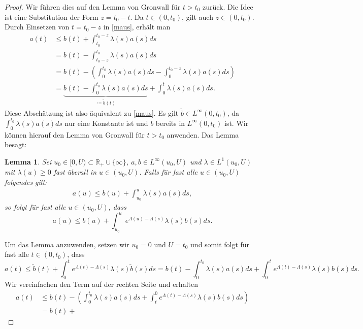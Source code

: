 \documentclass[a4paper]{article}
\theoremstyle{plain}
\newtheorem{lemma}{Lemma}
\begin{document}
	\begin{proof}
		Wir führen dies auf den Lemma von Gronwall für $t > t_0$ zurück. Die Idee ist eine Substitution der Form $z = t_0 - t$. Da $t \in (0,t_0)$, gilt auch $z \in (0,t_0)$. Durch Einsetzen von $t = t_0 - z$ in \eqref{maus},  erhält man
		\begin{align*}
			a(t) &\leq b(t) + \int^{t_0 -z}_{t_0} \lambda (s) a(s)ds\\ &= b(t) - \int^{t_0}_{t_0-z} \lambda (s) a(s)ds \\ &= b(t) - (\int^{t_0}_{0} \lambda (s) a(s)ds -  \int^{t_0-z}_{0} \lambda (s) a(s)ds) \\
			&= \underbrace{b(t) - \int^{t_0}_{0} \lambda (s) a(s)ds}_{ \coloneqq \tilde b(t)} +  \int^{t}_{0} \lambda (s) a(s)ds.
		\end{align*}
		Diese Abschätzung ist also äquivalent zu \eqref{maus}. Es gilt $\tilde b \in L^{\infty}(0,t_0)$, da $ \int^{t_0}_{0} \lambda (s) a(s)ds$ nur eine Konstante ist und $b$ bereits in $ L^{\infty}(0,t_0)$ ist. Wir können hierauf den Lemma von Gronwall für $t > t_0$ anwenden. Das Lemma besagt: 
		
		\begin{lemma}
			Sei $u_0 \in [0,U) \subset \mathbb R_+ \cup \{ \infty \}$, $a,b \in L^{\infty}(u_0,U)$ und $\lambda \in L^1(u_0,U)$ mit $\lambda(u) \geq 0$ fast überall in $u \in (u_0,U)$. Falls für fast alle $u \in (u_0,U)$ folgendes gilt: 
			\begin{align}
			a(u) \leq b(u) + \int^u_{u_0} \lambda(s) a(s) ds,
			\end{align}
			so folgt für fast alle $u \in (u_0,U)$, dass
			\[
			a(u) \leq b(u) + \int^u_{u_0} e^{\Lambda(u) - \Lambda(s)} \lambda(s) b(s) ds.
			\]
		\end{lemma}
		
		Um das Lemma anzuwenden, setzen wir $u_0 = 0$ und $U = t_0$ und somit folgt für fast alle $t \in (0,t_0)$, dass
		\[
			a(t) \leq \tilde b(t) + \int^t_0 e^{\Lambda(t) - \Lambda(s)} \lambda(s) \tilde b(s) ds = b(t) - \int^{t_0}_{0} \lambda (s) a(s)ds + \int^t_0 e^{\Lambda(t) - \Lambda(s)} \lambda(s) b(s) ds.
		\]
		Wir vereinfachen den Term auf der rechten Seite und erhalten
		\begin{align*}
			a(t) &\leq  b(t) - (\int^{t_0}_0 \lambda(s)a(s) ds + \int^0_t e^{\Lambda(t) - \Lambda(s)} \lambda(s) b(s) ds) \\
			&= b(t) + 
		\end{align*}
	\end{proof}
\end{document}
